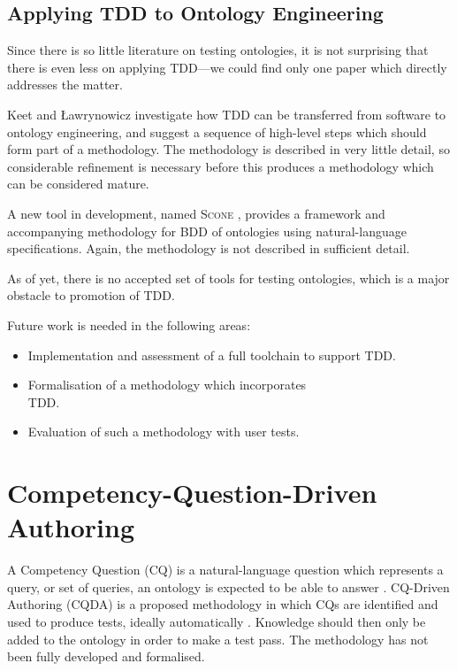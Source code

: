 \documentclass{sig-alternate}
\begin{document}
\subsection{Applying TDD to Ontology Engineering}

Since there is so little literature on testing ontologies, it is not surprising that there is even less on applying TDD---we could find only one paper which directly addresses the matter.

Keet and {\L}awrynowicz \cite{Keet:TDDOntologies} investigate how TDD can be transferred from software to ontology engineering, and suggest a sequence of high-level steps which should form part of a methodology.  The methodology is described in very little detail, so considerable refinement is necessary before this produces a methodology which can be considered mature.

A new tool in development, named \textsc{Scone} \cite{Scone:UserGuide,Scone:Bitbucket}, provides a framework and accompanying methodology for BDD of ontologies using natural-language specifications.  Again, the methodology is not described in sufficient detail.

As of yet, there is no accepted set of tools for testing ontologies, which is a major obstacle to promotion of TDD.

Future work is needed in the following areas:
\begin{itemize}[nosep]
  \item Implementation and assessment of a full toolchain to support TDD.
  \item Formalisation of a methodology which incorporates\\TDD.
  \item Evaluation of such a methodology with user tests.
\end{itemize}

\section{ Competency-Question-Driven Authoring}
\label{sec:cqd}

A Competency Question (CQ) is a natural-language question which represents a query, or set of queries, an ontology is expected to be able to answer \cite{Gruninger:Methodology}.  CQ-Driven Authoring (CQDA) is a proposed methodology in which CQs are identified and used to produce tests, ideally automatically \cite{Ren:CQDrivenAuthoring}.  Knowledge should then only be added to the ontology in order to make a test pass.  The methodology has not been fully developed and formalised.
\end{document}
